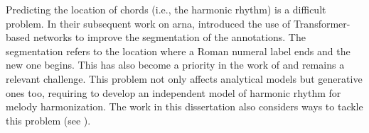 

Predicting the location of chords (i.e., the harmonic
rhythm) is a difficult problem. In their subsequent work on
\gls{arna}, \textcite{chen2019harmony,chen2021attend}
introduced the use of Transformer-based networks
\parencite{vaswani2017attention} to improve the segmentation
of the annotations. The segmentation refers to the location
where a Roman numeral label ends and the new one begins.
This has also become a priority in the work of
\textcite{micchi2021deep} and remains a relevant challenge.
This problem not only affects analytical models but
generative ones too, requiring \textcite{wu2021melody} to
develop an independent model of harmonic rhythm for melody
harmonization. The work in this dissertation also considers
ways to tackle this problem (see
).
